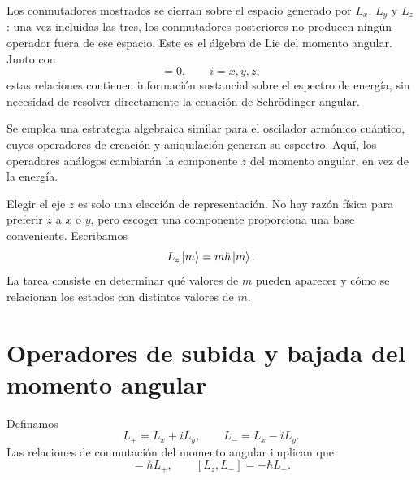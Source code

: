 Los conmutadores mostrados se cierran sobre el espacio generado por \(L_x\), \(L_y\) y \(L_z\): una vez incluidas las tres, los conmutadores posteriores no producen ningún operador fuera de ese espacio. Este es el álgebra de Lie del momento angular. Junto con
\begin{equation}
[H,L_i]=0,
\qquad i=x,y,z,
\end{equation}
estas relaciones contienen información sustancial sobre el espectro de energía, sin necesidad de resolver directamente la ecuación de Schr\"odinger angular.

Se emplea una estrategia algebraica similar para el oscilador armónico cuántico, cuyos operadores de creación y aniquilación generan su espectro. Aquí, los operadores análogos cambiarán la componente \(z\) del momento angular, en vez de la energía.

Elegir el eje \(z\) es solo una elección de representación. No hay razón física para preferir \(z\) a \(x\) o \(y\), pero escoger una componente proporciona una base conveniente. Escribamos
\begin{equation}
L_z\left\lvert m\right\rangle=m\hbar\left\lvert m\right\rangle.
\end{equation}
La tarea consiste en determinar qué valores de \(m\) pueden aparecer y cómo se relacionan los estados con distintos valores de \(m\).

\begin{classroomqa}
\end{classroomqa}

\section{Operadores de subida y bajada del momento angular}

Definamos
\begin{equation}
L_+=L_x+iL_y,
\qquad
L_-=L_x-iL_y.
\end{equation}
Las relaciones de conmutación del momento angular implican que
\begin{equation}
[L_z,L_+]=\hbar L_+,
\qquad
[L_z,L_-]=-\hbar L_-.
\end{equation}

